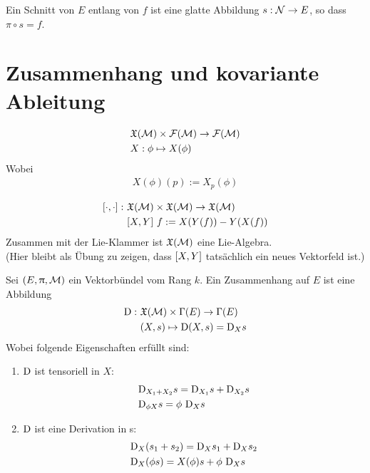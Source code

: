 \begin{defs}
Ein Schnitt von $E$ entlang von $f$ ist eine glatte Abbildung $s : \mathcal{N} \to E$, so dass $\pi \circ s = f$. 
\end{defs}

\section{Zusammenhang und kovariante Ableitung}

\begin{defs}
\begin{align*}
&\mathfrak{X}(\mathcal{M}) \times \mathcal{F}(\mathcal{M}) \to \mathcal{F}(\mathcal{M})\\
&X: \phi \mapsto X(\phi)
\end{align*}
Wobei
\begin{align}
X(\phi)(p):= X_p (\phi)
\end{align}
\end{defs}

\begin{defs}
\begin{align}
\comm{\cdot}{\cdot} : \ & \mathfrak{X}(\mfk) \times \mathfrak{X}(\mfk) \to \mathfrak{X}(\mfk)\\
&\comm{X}{Y} \ f := X(Y(f)) - Y(X(f))
\end{align}
Zusammen mit der Lie-Klammer ist $\mathfrak{X}(\mathcal{M})$ eine Lie-Algebra.\\
(Hier bleibt als Übung zu zeigen, dass $\comm{X}{Y}$ tatsächlich ein neues Vektorfeld ist.)
\end{defs}

\begin{defs}[Zusammenhang]
Sei $(E, \uppi, \mathcal{M})$ ein Vektorbündel vom Rang $k$.
Ein Zusammenhang auf $E$ ist eine Abbildung
\begin{align}
\mathrm{D} : \ & \mathfrak{X}(\mathcal{M}) \times \Gamma(E) \to \Gamma (E) \\
&(X, s) \mapsto \mathrm{D} (X, s) = \mathrm{D}_X s
\end{align}
Wobei folgende Eigenschaften erfüllt sind:
\begin{enumerate}
\item $\mathrm{D}$ ist tensoriell in $X$: 
\begin{align*}
&\mathrm{D}_{X_1 + X_2} s = \mathrm{D}_{X_1} s + \mathrm{D}_{X_2} s \\
&\mathrm{D}_{\phi X} s = \phi \ \mathrm{D}_X s
\end{align*}
\item $\mathrm{D}$ ist eine Derivation in s:
\begin{align*}
&\mathrm{D}_X (s_1 + s_2) = \mathrm{D}_X s_1 + \mathrm{D}_X s_2\\
&\mathrm{D}_X (\phi s) = X (\phi) s + \phi \ \mathrm{D}_X  s
\end{align*}
\end{enumerate}
\end{defs}

